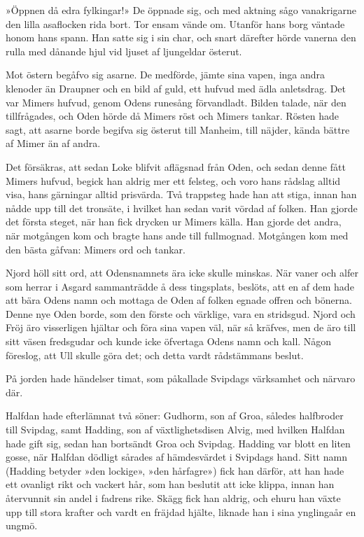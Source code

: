»Öppnen då edra fylkingar!» De öppnade sig, och med aktning sågo
vanakrigarne den lilla asaflocken rida bort. Tor ensam vände om. Utanför
hans borg väntade honom hans spann. Han satte sig i sin char, och snart
därefter hörde vanerna den rulla med dånande hjul vid ljuset af
ljungeldar österut.

Mot östern begåfvo sig asarne. De medförde, jämte sina vapen, inga andra
klenoder än Draupner och en bild af guld, ett hufvud med ädla
anletsdrag. Det var Mimers hufvud, genom Odens runesång förvandladt.
Bilden talade, när den tillfrågades, och Oden hörde då Mimers röst och
Mimers tankar. Rösten hade sagt, att asarne borde begifva sig österut
till Manheim, till näjder, kända bättre af Mimer än af andra.

Det försäkras, att sedan Loke blifvit aflägsnad från Oden, och sedan
denne fått Mimers hufvud, begick han aldrig mer ett felsteg, och voro
hans rådslag alltid visa, hans gärningar alltid prisvärda. Två trappsteg
hade han att stiga, innan han nådde upp till det tronsäte, i hvilket han
sedan varit vördad af folken. Han gjorde det första steget, när han fick
drycken ur Mimers källa. Han gjorde det andra, när motgången kom och
bragte hans ande till fullmognad. Motgången kom med den bästa gåfvan:
Mimers ord och tankar.

Njord höll sitt ord, att Odensnamnets ära icke skulle minskas. När vaner
och alfer som herrar i Asgard sammanträdde å dess tingsplats, beslöts,
att en af dem hade att bära Odens namn och mottaga de Oden af folken
egnade offren och bönerna. Denne nye Oden borde, som den förste och
värklige, vara en stridsgud. Njord och Fröj äro visserligen hjältar och
föra sina vapen väl, när så kräfves, men de äro till sitt väsen
fredsgudar och kunde icke öfvertaga Odens namn och kall. Någon föreslog,
att Ull skulle göra det; och detta vardt rådstämmans beslut.

På jorden hade händelser timat, som påkallade Svipdags värksamhet och
närvaro där.





Halfdan hade efterlämnat två söner: Gudhorm, son af Groa, således
halfbroder till Svipdag, samt Hadding, son af växtlighetsdisen Alvig,
med hvilken Halfdan hade gift sig, sedan han bortsändt Groa och Svipdag.
Hadding var blott en liten gosse, när Halfdan dödligt sårades af
hämdesvärdet i Svipdags hand. Sitt namn (Hadding betyder »den lockige»,
»den hårfagre») fick han därför, att han hade ett ovanligt rikt och
vackert hår, som han beslutit att icke klippa, innan han återvunnit sin
andel i fadrens rike. Skägg fick han aldrig, och ehuru han växte upp
till stora krafter och vardt en fräjdad hjälte, liknade han i sina
ynglingaår en ungmö.

